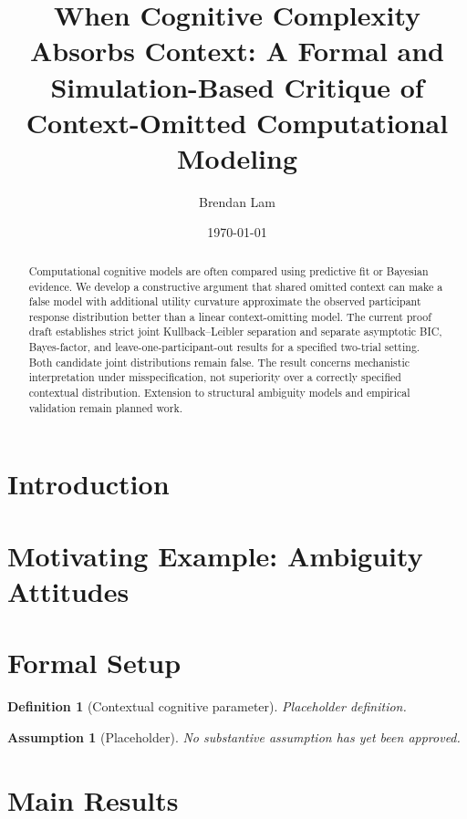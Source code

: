 \documentclass[11pt]{article}
\title{When Cognitive Complexity Absorbs Context: A Formal and Simulation-Based Critique of Context-Omitted Computational Modeling}
\author{Brendan Lam}
\date{\today}
\newtheorem{definition}{Definition}
\newtheorem{assumption}{Assumption}
\begin{document}
\maketitle

\begin{abstract}
Computational cognitive models are often compared using predictive fit or Bayesian evidence. We develop a constructive argument that shared omitted context can make a false model with additional utility curvature approximate the observed participant response distribution better than a linear context-omitting model. The current proof draft establishes strict joint Kullback--Leibler separation and separate asymptotic BIC, Bayes-factor, and leave-one-participant-out results for a specified two-trial setting. Both candidate joint distributions remain false. The result concerns mechanistic interpretation under misspecification, not superiority over a correctly specified contextual distribution. Extension to structural ambiguity models and empirical validation remain planned work.
\end{abstract}

\section{Introduction}


\section{Motivating Example: Ambiguity Attitudes}

\section{Formal Setup}

\begin{definition}[Contextual cognitive parameter]
Placeholder definition.
\end{definition}

\begin{assumption}[Placeholder]
No substantive assumption has yet been approved.
\end{assumption}

\section{Main Results}
\end{document}
